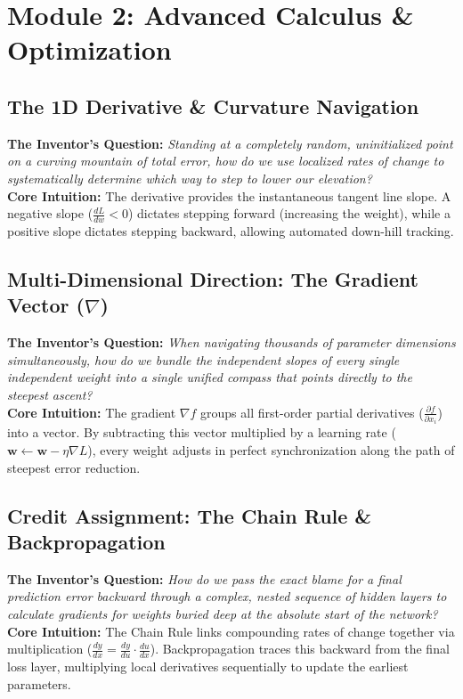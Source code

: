 \documentclass[12pt,a4paper]{article}
\begin{document}
\section{Module 2: Advanced Calculus \& Optimization}
\subsection{The 1D Derivative \& Curvature Navigation}
\textbf{The Inventor's Question:} \textit{Standing at a completely random, uninitialized point on a curving mountain of total error, how do we use localized rates of change to systematically determine which way to step to lower our elevation?} \\
\textbf{Core Intuition:} The derivative provides the instantaneous tangent line slope. A negative slope ($\frac{dL}{dw} < 0$) dictates stepping forward (increasing the weight), while a positive slope dictates stepping backward, allowing automated down-hill tracking.

\subsection{Multi-Dimensional Direction: The Gradient Vector ($\nabla$)}
\textbf{The Inventor's Question:} \textit{When navigating thousands of parameter dimensions simultaneously, how do we bundle the independent slopes of every single independent weight into a single unified compass that points directly to the steepest ascent?} \\
\textbf{Core Intuition:} The gradient $\nabla f$ groups all first-order partial derivatives ($\frac{\partial f}{\partial x_i}$) into a vector. By subtracting this vector multiplied by a learning rate ($\mathbf{w} \leftarrow \mathbf{w} - \eta \nabla L$), every weight adjusts in perfect synchronization along the path of steepest error reduction.

\subsection{Credit Assignment: The Chain Rule \& Backpropagation}
\textbf{The Inventor's Question:} \textit{How do we pass the exact blame for a final prediction error backward through a complex, nested sequence of hidden layers to calculate gradients for weights buried deep at the absolute start of the network?} \\
\textbf{Core Intuition:} The Chain Rule links compounding rates of change together via multiplication ($\frac{dy}{dx} = \frac{dy}{du} \cdot \frac{du}{dx}$). Backpropagation traces this backward from the final loss layer, multiplying local derivatives sequentially to update the earliest parameters.
\end{document}
